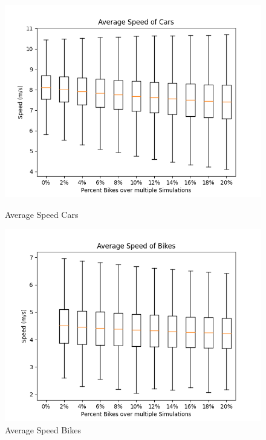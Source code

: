 \begin{figure}[H]
    \centering
    \begin{minipage}{0.45\textwidth}
        \centering
        \includegraphics[width=\linewidth]{./figures/avg_speed_car.png} 
         \caption{Average Speed Cars}\label{avg-speed-cars}
    \end{minipage}
    \begin{minipage}{0.45\textwidth}
        \centering
        \includegraphics[width=\linewidth]{./figures/avg_speed_bike.png} 
         \caption{Average Speed Bikes}\label{avg-speed-bikes}
    \end{minipage}
\end{figure}
\vspace{-0.7cm}
